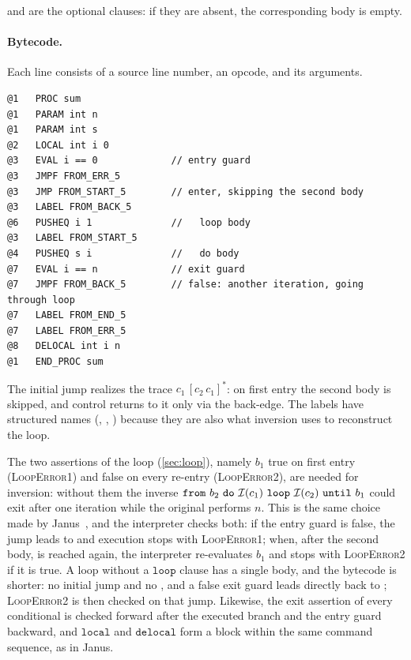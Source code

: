 \noindent
{} and  are the optional clauses: if they are absent,
the corresponding body is empty.

\paragraph{Bytecode.} Each line consists of a source line number, an opcode, and its
arguments.

\begin{lstlisting}
@1   PROC sum
@1   PARAM int n
@1   PARAM int s
@2   LOCAL int i 0
@3   EVAL i == 0             // entry guard
@3   JMPF FROM_ERR_5
@3   JMP FROM_START_5        // enter, skipping the second body
@3   LABEL FROM_BACK_5
@6   PUSHEQ i 1              //   loop body
@3   LABEL FROM_START_5
@4   PUSHEQ s i              //   do body
@7   EVAL i == n             // exit guard
@7   JMPF FROM_BACK_5        // false: another iteration, going through loop
@7   LABEL FROM_END_5
@7   LABEL FROM_ERR_5
@8   DELOCAL int i n
@1   END_PROC sum
\end{lstlisting}

\noindent
The initial jump realizes the trace $c_1\,[c_2\,c_1]^{*}$: on first entry
the second body is skipped, and control returns to it only via the back-edge. The
labels have structured names (, ,
) because they are also what inversion uses to reconstruct the
loop.

The two assertions of the loop (\cref{sec:loop}), namely $b_1$ true on first entry
(\textsc{LoopError1}) and false on every re-entry (\textsc{LoopError2}), are
needed for inversion: without them the inverse $\mathtt{from}\ b_2\ \mathtt{do}\
\mathcal{I}(c_1)\ \mathtt{loop}\ \mathcal{I}(c_2)\ \mathtt{until}\ b_1$ could exit after one
iteration while the original performs $n$. This is the same choice made by
Janus~\cite{YokoyamaGluck2007}, and the interpreter checks both: if the entry
guard is false, the jump leads to \code{FROM\_ERR} and execution stops with
\textsc{LoopError1}; when, after the second body, \code{FROM\_START} is reached
again, the interpreter re-evaluates $b_1$ and stops with
\textsc{LoopError2} if it is true. A loop without a $\mathtt{loop}$ clause has
a single body, and the bytecode is shorter: no initial jump and no
\code{FROM\_BACK}, and a false exit guard leads directly back to
\code{FROM\_START}; \textsc{LoopError2} is then checked on that jump.
Likewise, the exit assertion of every
conditional is checked forward after the executed branch and the entry
guard backward, and $\mathtt{local}$ and $\mathtt{delocal}$ form a
block within the same command sequence, as in Janus.

